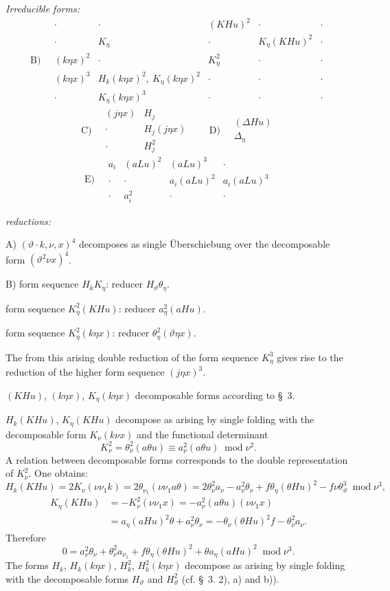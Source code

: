 \documentclass[11pt]{article}
\newcommand{\A}{\Delta}
\newcommand{\modu}[1]{\;\operatorname{mod} #1}
\providecommand{\modu}[1]{\;\operatorname{mod} #1}
\begin{document}
\noindent\emph{Irreducible forms:}
\[
\text{B)}\quad
\begin{array}{c|c|c|c|c}
\cdot&\cdot&(KHu)^2&\cdot&\cdot\\
\cdot&K_\eta&\cdot&K_\eta(KHu)^2&\cdot\\
(k\eta x)^2&\cdot&K_\eta^2&\cdot&\cdot\\
(k\eta x)^3&H_k(k\eta x)^2,\ K_\eta(k\eta x)^2&\cdot&\cdot&\cdot\\
\cdot&K_\eta(k\eta x)^3&\cdot&\cdot&\cdot
\end{array}
\]
\[
\text{C)}\quad
\begin{array}{cc}
(j\eta x)&H_j\\
\cdot&H_j(j\eta x)\\
\cdot&H_j^2
\end{array}
\qquad
\text{D)}\quad
\begin{array}{c}
(\A Hu)\\\A_\eta
\end{array}
\]
\[
\text{E)}\quad
\begin{array}{cccc}
a_i&(aLu)^2&(aLu)^3&\cdot\\
\cdot&\cdot&a_i(aLu)^2&a_i(aLu)^3\\
\cdot&a_i^2&\cdot&\cdot
\end{array}
\]

\noindent\emph{reductions:}

\noindent A) $(\vartheta\cdot k,\nu,x)^4$ decomposes as single Überschiebung over the decomposable form $(\vartheta^2\nu x)^4$.

\noindent B) form sequence $H_kK_\eta$: reducer $H_\vartheta\theta_\eta$.

form sequence $K_\eta^2(KHu)$: reducer $a_\eta^2(aHu)$.

form sequence $K_\eta^2(k\eta x)$: reducer $\theta_\eta^2(\vartheta\eta x)$.

The from this arising double reduction of the form sequence $K_\eta^3$ gives rise to the reduction of the higher form sequence $(j\eta x)^3$.

$(KHu)$, $(k\eta x)$, $K_\eta(k\eta x)$ decomposable forms according to \S\ 3.

$H_k(KHu)$, $K_\eta(KHu)$ decompose as arising by single folding with the decomposable form $K_\nu(k\nu x)$ and the functional determinant
\[
K_\nu^2=\theta_\nu^2(a\theta u)\equiv a_\nu^2(a\theta u)\modu{\nu^2}.
\]
A relation between decomposable forms corresponds to the double representation of $K_\nu^2$. One obtains:
\[
H_k(KHu)=2K_\nu(\nu\nu_1k)=2\theta_{\nu_1}(\nu\nu_1a\theta)
=2\theta_\nu^2a_\nu-a_\nu^2\theta_\nu+f\theta_\eta(\theta Hu)^2-f\nu\theta_\vartheta^3
\modu{\nu^3},
\]
\[
\begin{aligned}
K_\eta(KHu)&=-K_\nu^2(\nu\nu_1x)
=-a_\nu^2(a\theta u)(\nu\nu_1x)\\
&=a_\eta(aHu)^2\theta+a_\nu^2\theta_\nu
=-\theta_\nu(\theta Hu)^2f-\theta_\nu^2a_\nu.
\end{aligned}
\]
Therefore
\[
\tag{17}
0=a_\nu^2\theta_\nu+\theta_\nu^2a_{\nu_1}+f\theta_\eta(\theta Hu)^2+\theta a_\eta(aHu)^2\modu{\nu^3}.
\]
The forms $H_k$, $H_k(k\eta x)$, $H_k^2$, $H_k^2(k\eta x)$ decompose as arising by single folding with the decomposable forms $H_\vartheta$ and $H_\vartheta^2$ (cf. \S\ 3. 2), a) and b)).
\end{document}
